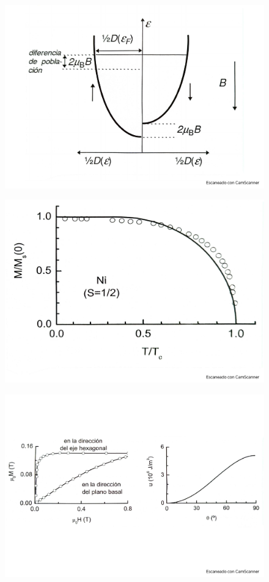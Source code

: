 \begin{figure}[h!] \centering
	\includegraphics[scale=0.5]{Cuerpo/Ch_10/Fotos libro 3.pdf}
	\caption{}
	\label{Fig:10-03}
\end{figure}
\begin{figure}[h!] \centering
	\includegraphics[scale=0.5]{Cuerpo/Ch_10/Fotos libro 4.pdf}
	\caption{}
	\label{Fig:10-04}
\end{figure}
\begin{figure}[h!] \centering
	\includegraphics[scale=0.5]{Cuerpo/Ch_10/Fotos libro 5.pdf}
	\caption{}
	\label{Fig:10-05}
\end{figure}
